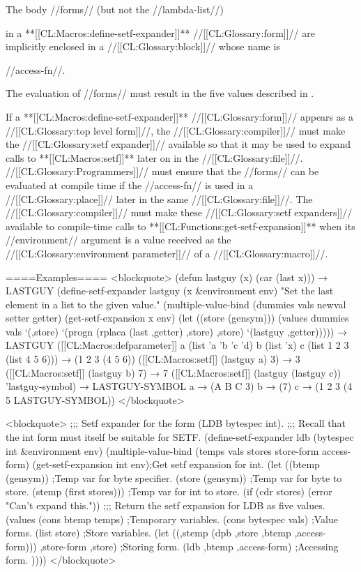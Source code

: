 The body //forms// (but not the //lambda-list//)

in a **[[CL:Macros:define-setf-expander]]** //[[CL:Glossary:form]]// are implicitly enclosed in a //[[CL:Glossary:block]]// whose name is

//access-fn//.

The evaluation of //forms// must result in the five values described in \secref\SetfExpansions.

If a **[[CL:Macros:define-setf-expander]]** //[[CL:Glossary:form]]// appears as a //[[CL:Glossary:top level form]]//, the //[[CL:Glossary:compiler]]// must make the //[[CL:Glossary:setf expander]]// available so that it may be used to expand calls to **[[CL:Macros:setf]]** later on in the //[[CL:Glossary:file]]//. //[[CL:Glossary:Programmers]]// must ensure that the //forms// can be evaluated at compile time if the //access-fn// is used in a //[[CL:Glossary:place]]// later in the same //[[CL:Glossary:file]]//. The //[[CL:Glossary:compiler]]// must make these //[[CL:Glossary:setf expanders]]// available to compile-time calls to **[[CL:Functions:get-setf-expansion]]** when its //environment// argument is a value received as the //[[CL:Glossary:environment parameter]]// of a //[[CL:Glossary:macro]]//.

====Examples==== <blockquote> (defun lastguy (x) (car (last x))) → LASTGUY (define-setf-expander lastguy (x &environment env) "Set the last element in a list to the given value." (multiple-value-bind (dummies vals newval setter getter) (get-setf-expansion x env) (let ((store (gensym))) (values dummies vals `(,store) `(progn (rplaca (last ,getter) ,store) ,store) `(lastguy ,getter))))) → LASTGUY ([[CL:Macros:defparameter]] a (list 'a 'b 'c 'd) b (list 'x) c (list 1 2 3 (list 4 5 6))) → (1 2 3 (4 5 6)) ([[CL:Macros:setf]] (lastguy a) 3) → 3 ([[CL:Macros:setf]] (lastguy b) 7) → 7 ([[CL:Macros:setf]] (lastguy (lastguy c)) 'lastguy-symbol) → LASTGUY-SYMBOL a → (A B C 3) b → (7) c → (1 2 3 (4 5 LASTGUY-SYMBOL)) </blockquote>



<blockquote> ;;; Setf expander for the form (LDB bytespec int). ;;; Recall that the int form must itself be suitable for SETF. (define-setf-expander ldb (bytespec int &environment env) (multiple-value-bind (temps vals stores store-form access-form) (get-setf-expansion int env);Get setf expansion for int. (let ((btemp (gensym)) ;Temp var for byte specifier. (store (gensym)) ;Temp var for byte to store. (stemp (first stores))) ;Temp var for int to store. (if (cdr stores) (error "Can't expand this.")) ;;; Return the setf expansion for LDB as five values. (values (cons btemp temps) ;Temporary variables. (cons bytespec vals) ;Value forms. (list store) ;Store variables. \bq(let ((,stemp (dpb ,store ,btemp ,access-form))) ,store-form ,store) ;Storing form. \bq(ldb ,btemp ,access-form) ;Accessing form. )))) </blockquote>

